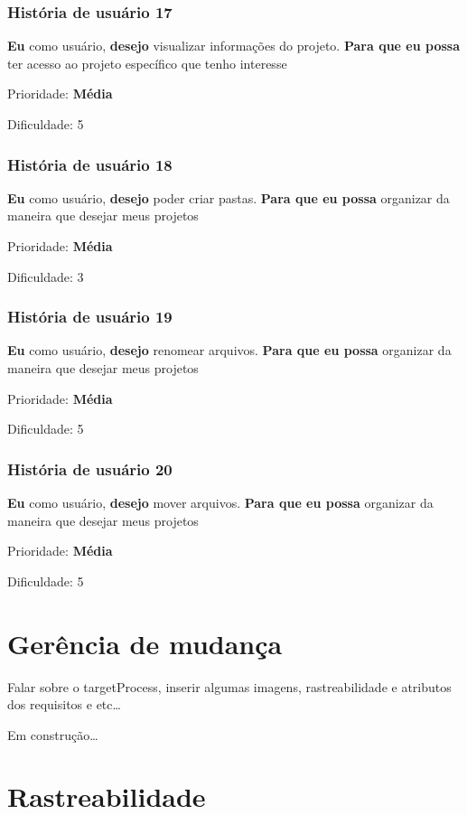   \subsubsection{História de usuário 17}
    \textbf{Eu} como usuário, \textbf{desejo} visualizar informações do projeto. \textbf{Para que eu possa} ter acesso ao projeto específico que tenho interesse

    Prioridade: \textbf{Média}

    Dificuldade: 5

  \subsubsection{História de usuário 18}
    \textbf{Eu} como usuário, \textbf{desejo} poder criar pastas. \textbf{Para que eu possa} organizar da maneira que desejar meus projetos

    Prioridade: \textbf{Média}

    Dificuldade: 3

  \subsubsection{História de usuário 19}
    \textbf{Eu} como usuário, \textbf{desejo} renomear arquivos. \textbf{Para que eu possa} organizar da maneira que desejar meus projetos

    Prioridade: \textbf{Média}

    Dificuldade: 5

  \subsubsection{História de usuário 20}
    \textbf{Eu} como usuário, \textbf{desejo} mover arquivos. \textbf{Para que eu possa} organizar da maneira que desejar meus projetos

    Prioridade: \textbf{Média}

    Dificuldade: 5



\section{Gerência de mudança}

  Falar sobre o targetProcess, inserir algumas imagens, rastreabilidade e atributos dos requisitos e etc\ldots

  Em construção\ldots

\section{Rastreabilidade}

